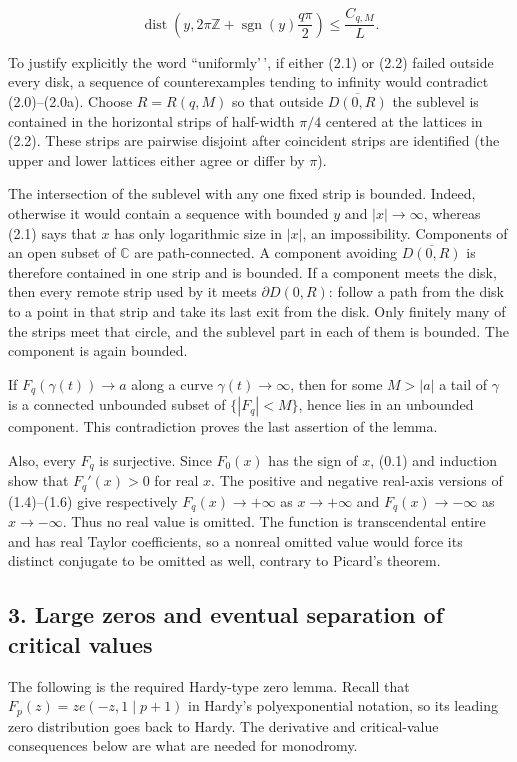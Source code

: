 \[
 \operatorname{dist}\!\left(
 y,2\pi\mathbb Z+\operatorname{sgn}(y)\frac{q\pi}{2}
 \right)\leq \frac{C_{q,M}}L.
\tag{Inv-2.2}
\]

To justify explicitly the word ``uniformly'\,', if either (2.1) or (2.2)
failed outside every disk, a sequence of counterexamples tending to infinity
would contradict (2.0)--(2.0a). Choose \(R=R(q,M)\) so that outside
\(\overline{D(0,R)}\) the sublevel is contained in the horizontal strips of
half-width \(\pi/4\) centered at the lattices in (2.2). These strips are
pairwise disjoint after coincident strips are identified (the upper and
lower lattices either agree or differ by \(\pi\)).

The intersection of the sublevel with any one fixed strip is bounded.
Indeed, otherwise it would contain a sequence with bounded \(y\) and
\(|x|\to\infty\), whereas (2.1) says that \(x\) has only logarithmic size in
\(|x|\), an impossibility. Components of an open subset of \(\mathbb C\)
are path-connected. A component avoiding \(\overline{D(0,R)}\) is therefore
contained in one strip and is bounded. If a component meets the disk, then
every remote strip used by it meets \(\partial D(0,R)\): follow a path from
the disk to a point in that strip and take its last exit from the disk. Only
finitely many of the strips meet that circle, and the sublevel part in each
of them is bounded. The component is again bounded.

If \(F_q(\gamma(t))\to a\) along a curve \(\gamma(t)\to\infty\), then for
some \(M>|a|\) a tail of \(\gamma\) is a connected unbounded subset of
\(\{|F_q|<M\}\), hence lies in an unbounded component. This contradiction
proves the last assertion of the lemma.

Also, every \(F_q\) is surjective. Since \(F_0(x)\) has the sign of \(x\),
(0.1) and induction show that \(F_q'(x)>0\) for real \(x\). The positive
and negative real-axis versions of (1.4)--(1.6) give respectively
\(F_q(x)\to+\infty\) as \(x\to+\infty\) and
\(F_q(x)\to-\infty\) as \(x\to-\infty\). Thus no real value is omitted.
The function is transcendental entire and has real Taylor coefficients, so
a nonreal omitted value would force its distinct conjugate to be omitted as
well, contrary to Picard's theorem.

\subsection{3. Large zeros and eventual separation of critical values}

The following is the required Hardy-type zero lemma. Recall that
\(F_p(z)=z e(-z,1\mid p+1)\) in Hardy's polyexponential notation, so its
leading zero distribution goes back to Hardy. The derivative and
critical-value consequences below are what are needed for monodromy.


